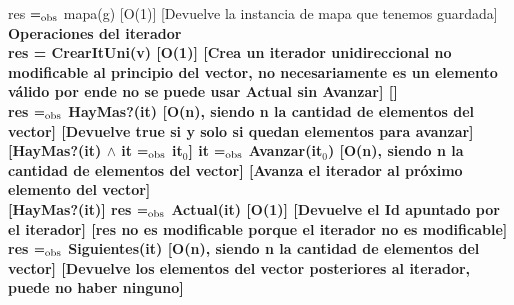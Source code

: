 
{res $=_{\mathrm{obs}}$ mapa(g)}
[O(1)]
[Devuelve la instancia de mapa que tenemos guardada]
\\

%


\bf{Operaciones del iterador}\\

{res = CrearItUni(v)}
[O(1)]
[Crea un iterador unidireccional no modificable al principio del vector, no necesariamente es un elemento válido por ende no se puede usar Actual sin Avanzar]
[]\\

{res $=_{\mathrm{obs}}$ HayMas?(it)}
[O(n), siendo n la cantidad de elementos del vector]
[Devuelve true si y solo si quedan elementos para avanzar]\\

[HayMas?(it) $\wedge$ it $=_{\mathrm{obs}}$ it$_0$]
{it $=_{\mathrm{obs}}$ Avanzar(it$_0$)}
[O(n), siendo n la cantidad de elementos del vector]
[Avanza el iterador al próximo elemento del vector]\\

[HayMas?(it)]
{res $=_{\mathrm{obs}}$ Actual(it)}
[O(1)]
[Devuelve el Id apuntado por el iterador]
[res no es modificable porque el iterador no es modificable]\\

{res $=_{\mathrm{obs}}$ Siguientes(it)}
[O(n), siendo n la cantidad de elementos del vector]
[Devuelve los elementos del vector posteriores al iterador, puede no haber ninguno]\\


